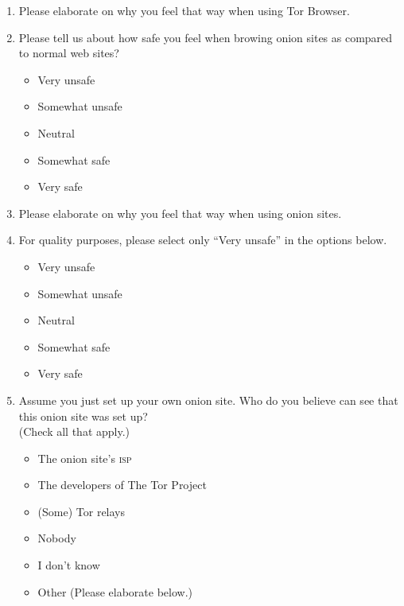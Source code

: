 \begin{enumerate}
    \item Please elaborate on why you feel that way when using Tor Browser.

    \item Please tell us about how safe you feel when browing onion sites as
        compared to normal web sites?
        \label{q6_5}
        \begin{itemize}[label=$\Circle$]
            \item Very unsafe
            \item Somewhat unsafe
            \item Neutral
            \item Somewhat safe
            \item Very safe
        \end{itemize}

    \item Please elaborate on why you feel that way when using onion sites.

    \item For quality purposes, please select only ``Very unsafe'' in the options
        below.
        \begin{itemize}[label=$\Circle$]
            \item Very unsafe
            \item Somewhat unsafe
            \item Neutral
            \item Somewhat safe
            \item Very safe
        \end{itemize}

    \item Assume you just set up your own onion site. Who do you believe can
        see that this onion site was set up?\\(Check all that apply.)
        \begin{itemize}[label=$\Square$]
            \item The onion site's \textsc{isp}
            \item The developers of The Tor Project
            \item (Some) Tor relays
            \item Nobody
            \item I don't know
            \item Other (Please elaborate below.)
        \end{itemize}


\end{enumerate}
